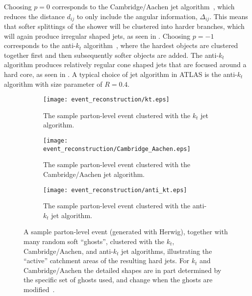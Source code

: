 Choosing $p=0$ corresponds to the Cambridge/Aachen jet algorithm~\cite{Dokshitzer:1997in}, which reduces the distance $d_{ij}$ to only include the angular information, $\Delta_{ij}$.
This means that softer splittings of the shower will be clustered into harder branches, which will again produce irregular shaped jets, as seen in .
Choosing $p=-1$ corresponds to the anti-$k_{t}$ algorithm~\cite{Cacciari:2008gp}, where the hardest objects are clustered together first and then subsequently softer objects are added.
The anti-$k_{t}$ algorithm produces relatively regular cone shaped jets that are focused around a hard core, as seen in .
A typical choice of jet algorithm in ATLAS is the anti-$k_{t}$ algorithm with size parameter of $R=0.4$.

\begin{figure}[htbp]
 \centering
 \begin{subfigure}[t]{0.315\textwidth}
  \centering
  \texttt{[image: event\_reconstruction/kt.eps]}
  \caption[The sample parton-level event clustered with the $k_{t}$ jet algorithm.]{%
   The sample parton-level event clustered with the $k_{t}$ jet algorithm.}
  \label{fig:jet_algorithms_kt}
 \end{subfigure}%
 \quad
 \begin{subfigure}[t]{0.315\textwidth}
  \centering
  \texttt{[image: event\_reconstruction/Cambridge\_Aachen.eps]}
  \caption[The sample parton-level event clustered with the Cambridge/Aachen jet algorithm.]{%
   The sample parton-level event clustered with the Cambridge/Aachen jet algorithm.}
  \label{fig:jet_algorithms_Cambridge_Aachen}
 \end{subfigure}%
 \quad
 \begin{subfigure}[t]{0.315\textwidth}
  \centering
  \texttt{[image: event\_reconstruction/anti\_kt.eps]}
  \caption[The sample parton-level event clustered with the anti-$k_{t}$ jet algorithm.]{%
   The sample parton-level event clustered with the anti-$k_{t}$ jet algorithm.}
  \label{fig:jet_algorithms_anti_kt}
 \end{subfigure}%
 \caption[A sample parton-level event, together with many random soft ``ghosts'', clustered with three different jet algorithms, illustrating the ``active'' catchment areas of the resulting hard jets.]{%
  A sample parton-level event (generated with Herwig), together with many random soft ``ghosts'', clustered with the $k_{t}$, Cambridge/Aachen, and anti-$k_{t}$ jet algorithms, illustrating the ``active'' catchment areas of the resulting hard jets.
  For $k_{t}$ and Cambridge/Aachen the detailed shapes are in part determined by the specific set of ghosts used, and change when the ghosts are modified~\cite{Cacciari:2008gp}.}
 \label{fig:jet_algorithms}
\end{figure}



